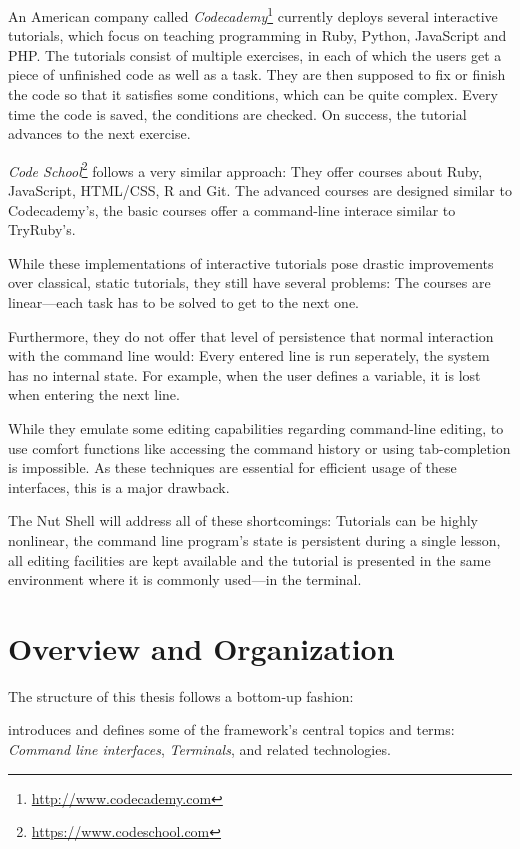 \documentclass[paper=a4,twoside,abstract=on,cleardoublepage=empty,numbers=noenddot,toc=bib,12pt,appendixprefix=true]{scrreprt}
\begin{document}
An American company called \emph{Codecademy}\footnote{\url{http://www.codecademy.com}} currently deploys several interactive tutorials, which focus on teaching programming in Ruby, Python, JavaScript and PHP. The tutorials consist of multiple exercises, in each of which the users get a piece of unfinished code as well as a task. They are then supposed to fix or finish the code so that it satisfies some conditions, which can be quite complex. Every time the code is saved, the conditions are checked. On success, the tutorial advances to the next exercise.

\emph{Code School}\footnote{\url{https://www.codeschool.com}} follows a very similar approach: They offer courses about Ruby, JavaScript, HTML/CSS, R and Git. The advanced courses are designed similar to Codecademy's, the basic courses offer a command-line interace similar to TryRuby's.

While these implementations of interactive tutorials pose drastic improvements over classical, static tutorials, they still have several problems: The courses are linear---each task has to be solved to get to the next one.

Furthermore, they do not offer that level of persistence that normal interaction with the command line would: Every entered line is run seperately, the system has no internal state. For example, when the user defines a variable, it is lost when entering the next line.

While they emulate some editing capabilities regarding command-line editing, to use comfort functions like accessing the command history or using tab-completion is impossible. As these techniques are essential for efficient usage of these interfaces, this is a major drawback.

The Nut Shell will address all of these shortcomings: Tutorials can be highly nonlinear, the command line program's state is persistent during a single lesson, all editing facilities are kept available and the tutorial is presented in the same environment where it is commonly used---in the terminal.

\section{Overview and Organization}

The structure of this thesis follows a bottom-up fashion:

 introduces and defines some of the framework's central topics and terms: \emph{Command line interfaces}, \emph{Terminals}, and related technologies.
\end{document}

